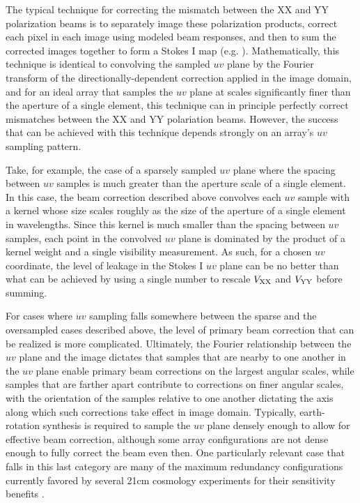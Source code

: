 \documentclass[twocolumn,apj,numberedappendix]{emulateapj}
\begin{document}
The typical technique for correcting the mismatch between the XX and YY polarization beams is to separately
image these polarization products, correct each pixel in each image using modeled beam responses,
and then to sum the corrected images together to form a Stokes I map 
(e.g. \citealt{sullivan,lofar,bernardi}).  Mathematically, this technique is identical to convolving the sampled
$uv$ plane by the Fourier transform of the directionally-dependent correction applied in the image domain, and for an ideal
array that samples the $uv$ plane at scales significantly finer than the aperture of a single element, this technique can
in principle perfectly correct mismatches between the XX and YY polariation beams.
However, the success that can be achieved with this technique depends strongly on an array's $uv$ sampling pattern.

Take, for example, the case of a sparsely sampled $uv$ plane where the spacing between $uv$ samples is much greater than
the aperture scale of a single element.  In this case, the beam correction described above 
convolves each $uv$ sample with a kernel whose size scales roughly as the size of the aperture of a
single element in wavelengths.  Since this kernel is much smaller than the spacing between $uv$ samples, 
each point in the convolved $uv$ plane is dominated by the product of a kernel weight and a single visibility measurement.
As such, for a chosen $uv$ coordinate, the level of leakage in the Stokes I $uv$ plane can
be no better than what can be achieved by using a single number to rescale ${V_{\rm XX}}$ and ${V_{\rm YY}}$ before summing.  

For cases where $uv$ sampling falls somewhere between the sparse and the oversampled cases described above, the level
of primary beam correction that can be realized is more complicated.  Ultimately, the Fourier relationship between
the $uv$ plane and the image dictates that samples that are nearby to one
another in the $uv$ plane enable primary beam corrections on the largest angular scales, while samples that are farther
apart contribute to corrections on finer angular scales, with the orientation of the samples relative to one another
dictating the axis along which such corrections take effect in image domain.  Typically, earth-rotation synthesis
is required to sample the $uv$ plane densely enough to allow for effective beam correction, although some array
configurations are not dense enough to fully correct the beam even then.  One particularly relevant case that falls
in this last category are many of the maximum redundancy configurations currently favored by several 21cm cosmology experiments
for their sensitivity benefits \citep{parsons_et_al2012a,P14}.
\end{document}
